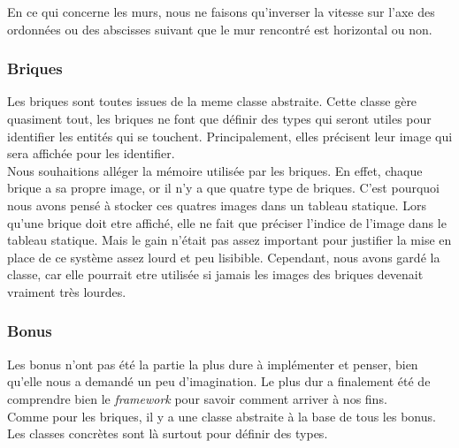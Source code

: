 \documentclass[a4paper,10pt]{article}
\begin{document}
        En ce qui concerne les murs, nous ne faisons qu'inverser la vitesse sur l'axe des ordonnées ou des abscisses suivant
        que le mur rencontré est horizontal ou non.


    \subsubsection{Briques}
        Les briques sont toutes issues de la meme classe abstraite. Cette classe gère quasiment tout, les briques ne font
        que définir des types qui seront utiles pour identifier les entités qui se touchent. Principalement, elles
        précisent leur image qui sera affichée pour les identifier. \\

        Nous souhaitions alléger la mémoire utilisée par les briques. En effet, chaque brique a sa propre image, or
        il n'y a que quatre type de briques. C'est pourquoi nous avons pensé à stocker ces quatres images dans un
        tableau statique. Lors qu'une brique doit etre affiché, elle ne fait que préciser l'indice de l'image
        dans le tableau statique. Mais le gain n'était pas assez important pour justifier la mise en place de
        ce système assez lourd et peu lisibible. Cependant, nous avons gardé la classe, car elle pourrait etre
        utilisée si jamais les images des briques devenait vraiment très lourdes.

    \subsubsection{Bonus}
        Les bonus n'ont pas été la partie la plus dure à implémenter et penser, bien qu'elle nous a demandé un peu
        d'imagination. Le plus dur a finalement été de comprendre bien le \textit{framework} pour savoir
        comment arriver à nos fins. \\

        Comme pour les briques, il y a une classe abstraite à la base de tous les bonus. Les classes concrètes
        sont là surtout pour définir des types.
\end{document}

